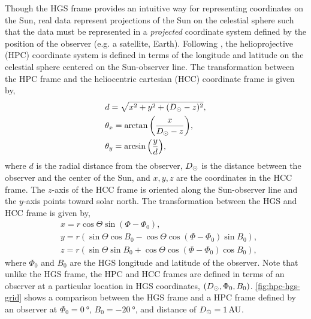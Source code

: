 Though the HGS frame provides an intuitive way for representing coordinates on the Sun, real data represent projections of the Sun on the celestial sphere such that the data must be represented in a \textit{projected} coordinate system defined by the position of the observer (e.g. a satellite, Earth). Following \citet{thompson_coordinate_2006}, the helioprojective (HPC) coordinate system is defined in terms of the longitude and latitude on the celestial sphere centered on the Sun-observer line. The transformation between the HPC frame and the heliocentric cartesian (HCC) coordinate frame is given by,
\begin{align}\label{eq:hcc_hpc_transform}
    &d = \sqrt{x^2 + y^2  + (D_{\odot} - z)^2}, \\
    &\theta_x = \arctan{\left(\frac{x}{D_{\odot} - z}\right)}, \\
    &\theta_y = \arcsin{\left(\frac{y}{d}\right)},
\end{align}
where $d$ is the radial distance from the observer, $D_{\odot}$ is the distance between the observer and the center of the Sun, and $x,y,z$ are the coordinates in the HCC frame. The $z$-axis of the HCC frame is oriented along the Sun-observer line and the $y$-axis points toward solar north. The transformation between the HGS and HCC frame is given by,
\begin{align}\label{eq:hgs_hcc_transform}
    &x = r\cos{\Theta}\sin{(\Phi - \Phi_0)}, \\
    &y = r\left( \sin{\Theta}\cos{B_0} - \cos{\Theta}\cos{(\Phi - \Phi_0)}\sin{B_0} \right), \\
    &z = r\left( \sin{\Theta}\sin{B_0} + \cos{\Theta}\cos{(\Phi - \Phi_0)}\cos{B_0} \right),
\end{align}
where $\Phi_0$ and $B_0$ are the HGS longitude and latitude of the observer. Note that unlike the HGS frame, the HPC and HCC frames are defined in terms of an observer at a particular location in HGS coordinates, $(D_{\odot}, \Phi_0, B_0)$. \autoref{fig:hpc-hgs-grid} shows a comparison between the HGS frame and a HPC frame defined by an observer at $\Phi_0=\SI{0}{\degree}$, $B_0=\SI{-20}{\degree}$, and distance of $D_{\odot}=1\,\textup{AU}$.

